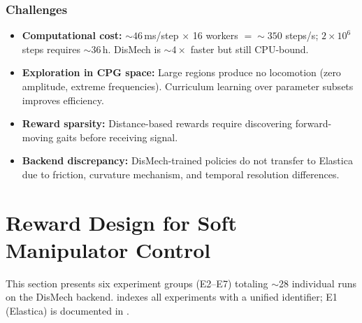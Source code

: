 \documentclass[11pt]{article}
\begin{document}
\subsubsection{Challenges}
\label{sec:rl-elastica:challenges}

\begin{itemize}
  \item \textbf{Computational cost:} ${\sim}46$\,ms/step $\times$ 16 workers $= {\sim}350$ steps/s; $2 \times 10^6$ steps requires ${\sim}36$\,h. DisMech is ${\sim}4\times$ faster but still CPU-bound.
  \item \textbf{Exploration in CPG space:} Large regions produce no locomotion (zero amplitude, extreme frequencies). Curriculum learning over parameter subsets improves efficiency.
  \item \textbf{Reward sparsity:} Distance-based rewards require discovering forward-moving gaits before receiving signal.
  \item \textbf{Backend discrepancy:} DisMech-trained policies do not transfer to Elastica due to friction, curvature mechanism, and temporal resolution differences.
\end{itemize}

\section{Reward Design for Soft Manipulator Control}
\label{sec:experiments}

This section presents six experiment groups (E2--E7) totaling ${\sim}$28 individual runs on the DisMech backend.
 indexes all experiments with a unified identifier; E1 (Elastica) is documented in .
\end{document}
